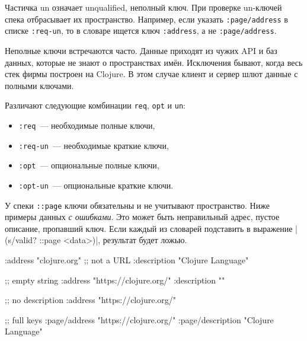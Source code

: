 
Частичка un означает unqualified, неполный ключ. При проверке un-ключей
спека отбрасывает их пространство. Например, если указать \verb|:page/address|
в списке \verb|:req-un|, то в словаре ищется ключ \verb|:address|, а не
\verb|:page/address|.

Неполные ключи встречаются часто. Данные приходят из чужих API и баз данных,
которые не знают о пространствах имён. Исключения бывают, когда весь стек фирмы
построен на Clojure. В этом случае клиент и сервер шлют данные с полными
ключами.

Различают следующие комбинации \verb|req|, \verb|opt| и \verb|un|:

\begin{itemize}

\item
  \verb|:req|~--- необходимые полные ключи,

\item
  \verb|:req-un|~--- необходимые краткие ключи,


\item
  \verb|:opt|~--- опциональные полные ключи,


\item
  \verb|:opt-un|~--- опциональные краткие ключи.

\end{itemize}

У спеки \verb|::page| ключи обязательны и не учитывают пространство. Ниже
примеры данных \emph{с ошибками}. Это может быть неправильный адрес, пустое
описание, пропавший ключ. Если каждый из словарей подставить в выражение
\spverb|(s/valid? ::page <data>)|, результат будет ложью.

\ifx\DEVICETYPE\MOBILE

\begin{english}
  \begin{clojure}
{:address "clojure.org" ;; not a URL
 :description "Clojure Language"}

;; empty string
{:address "https://clojure.org/"
 :description ""}

;; no description
{:address "https://clojure.org/"}

 ;; full keys
{:page/address "https://clojure.org/"
 :page/description "Clojure Language"}
  \end{clojure}
\end{english}

